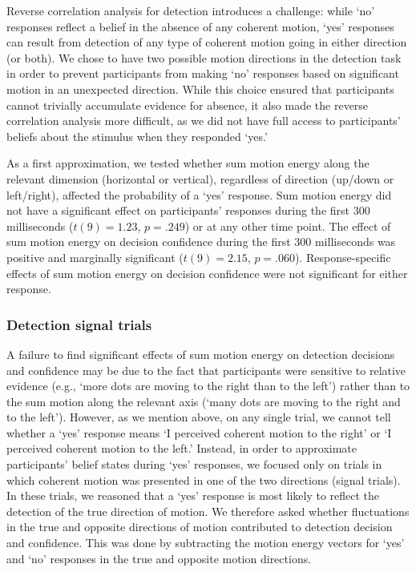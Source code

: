 \documentclass[12pt,twoside]{reedthesis}
\begin{document}
Reverse correlation analysis for detection introduces a challenge: while `no' responses reflect a belief in the absence of any coherent motion, `yes' responses can result from detection of any type of coherent motion going in either direction (or both). We chose to have two possible motion directions in the detection task in order to prevent participants from making `no' responses based on significant motion in an unexpected direction. While this choice ensured that participants cannot trivially accumulate evidence for absence, it also made the reverse correlation analysis more difficult, as we did not have full access to participants' beliefs about the stimulus when they responded `yes.'

As a first approximation, we tested whether sum motion energy along the relevant dimension (horizontal or vertical), regardless of direction (up/down or left/right), affected the probability of a `yes' response. Sum motion energy did not have a significant effect on participants' responses during the first 300 milliseconds (\(t(9) = 1.23\), \(p = .249\)) or at any other time point. The effect of sum motion energy on decision confidence during the first 300 milliseconds was positive and marginally significant (\(t(9) = 2.15\), \(p = .060\)). Response-specific effects of sum motion energy on decision confidence were not significant for either response.

\hypertarget{detection-signal-trials}{%
\subsubsection*{Detection signal trials}\label{detection-signal-trials}}

A failure to find significant effects of sum motion energy on detection decisions and confidence may be due to the fact that participants were sensitive to relative evidence (e.g., `more dots are moving to the right than to the left') rather than to the sum motion along the relevant axis (`many dots are moving to the right and to the left'). However, as we mention above, on any single trial, we cannot tell whether a `yes' response means `I perceived coherent motion to the right' or `I perceived coherent motion to the left.' Instead, in order to approximate participants' belief states during `yes' responses, we focused only on trials in which coherent motion was presented in one of the two directions (signal trials). In these trials, we reasoned that a `yes' response is most likely to reflect the detection of the true direction of motion. We therefore asked whether fluctuations in the true and opposite directions of motion contributed to detection decision and confidence. This was done by subtracting the motion energy vectors for `yes' and `no' responses in the true and opposite motion directions.
\end{document}
